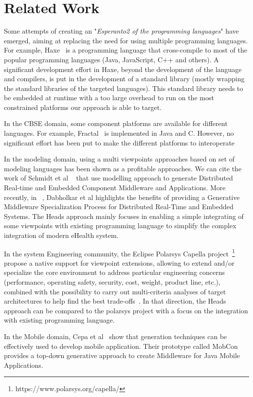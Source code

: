 \section{Related Work}

Some attempts of creating an "\textit{Esperanto2 of the programming languages}" have emerged, aiming at replacing the need for using multiple programming languages. For example, Haxe~\cite{dasnois2011haxe} is a programming language that cross-compile to most of the popular programming languages (Java, JavaScript, C++ and others). A significant development effort in Haxe, beyond the development of the language and compilers, is put in the development of a standard library (mostly wrapping the standard libraries of the targeted languages). This standard library needs to be embedded at runtime with a too large overhead to run on the most constrained platforms our approach is able to target. 

In the CBSE domain, some component platforms are available for different languages. For example, Fractal~\cite{bruneton2006fractal} is implemented in Java and C. However, no significant effort has been put to make the different platforms to interoperate 

In the modeling domain, using a multi viewpoints approaches based on set of modeling languages has been shown as a profitable approaches. We can cite the work of Schmidt et al ~\cite{DBLP:conf/middleware/GokhaleSLNW03} that use modelling approach to generate Distributed Real-time and Embedded Component Middleware and Applications. More recently, in  ~\cite{5753608}, Dabholkar et al highlights the benefits of providing a Generative Middleware Specialization Process for Distributed Real-Time and Embedded Systems.  The Heads approach  mainly focuses in enabling a simple integrating of some viewpoints with existing programming language to simplify the complex integration of modern eHealth system. 

In the system Engineering community, the Eclipse Polarsys Capella project~\footnote{https://www.polarsys.org/capella/} propose a  native support for viewpoint extensions, allowing to extend and/or specialize the core environment to address particular engineering concerns (performance, operating safety, security, cost, weight, product line, etc.), combined with the possibility to carry out multi-criteria analyses of target architectures to help find the best trade-offs~\cite{voirin2013arcadia}. In that direction, the Heads approach can be compared to the polarsys project with a focus on the integration  with existing programming language.

In the Mobile domain, Cepa et al~\cite{1385821} show that generation techniques can be effectively used to develop mobile application.  Their prototype called MobCon provides a top-down generative approach to create Middleware for Java Mobile Applications. 
